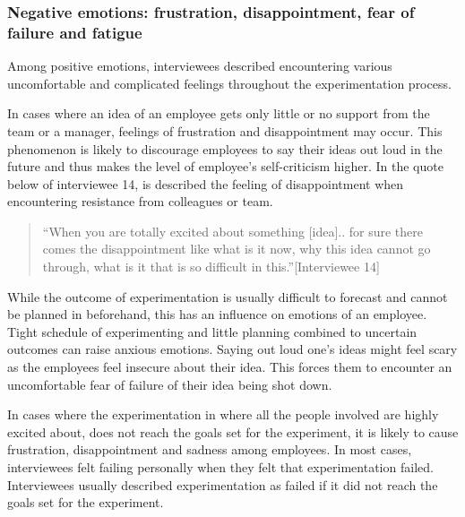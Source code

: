\subsubsection{Negative emotions: frustration, disappointment, fear of failure and fatigue}
Among positive emotions, interviewees described encountering various uncomfortable and complicated feelings throughout the experimentation process. 

In cases where an idea of an employee gets only little or no support from the team or a manager, feelings of frustration and disappointment may occur. This phenomenon is likely to discourage employees to say their ideas out loud in the future and thus makes the level of employee's self-criticism higher. In the quote below of interviewee 14, is described the feeling of disappointment when encountering resistance from colleagues or team.
\begin{quote}
``When you are totally excited about something [idea].. for sure there comes the disappointment like what is it now, why this idea cannot go through, what is it that is so difficult in this.''[Interviewee 14]
\end{quote}
While the outcome of experimentation is usually difficult to forecast and cannot be planned in beforehand, this has an influence on emotions of an employee. Tight schedule of experimenting and little planning combined to uncertain outcomes can raise anxious emotions. Saying out loud one's ideas might feel scary as the employees feel insecure about their idea. This forces them to encounter an uncomfortable fear of failure of their idea being shot down. 

In cases where the experimentation in where all the people involved are highly excited about, does not reach the goals set for the experiment, it is likely to cause frustration, disappointment and sadness among employees. In most cases, interviewees felt failing personally when they felt that experimentation failed. Interviewees usually described experimentation as failed if it did not reach the goals set for the experiment. 

